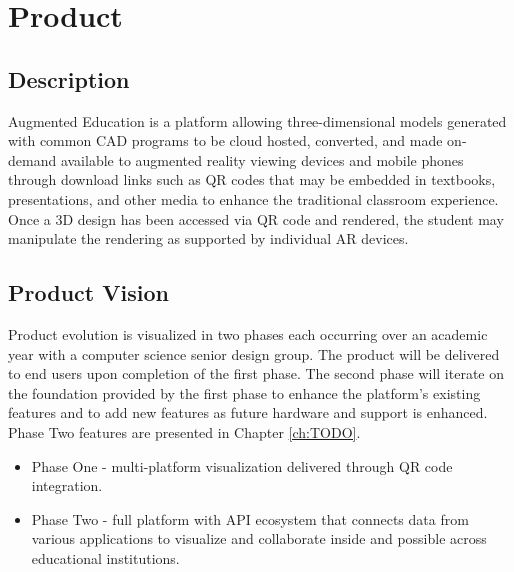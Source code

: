 \section{Product}

\subsection{Description}
Augmented Education is a platform allowing three-dimensional models generated with common CAD programs to be cloud hosted, converted, and made on-demand available to augmented reality viewing devices and mobile phones through download links such as QR codes that may be embedded in textbooks, presentations, and other media to enhance the traditional classroom experience. Once a 3D design has been accessed via QR code and rendered, the student may manipulate the rendering as supported by individual AR devices. 

\subsection{Product Vision}
Product evolution is visualized in two phases each occurring over an academic year with a computer science senior design group. The product will be delivered to end users upon completion of the first phase. The second phase will iterate on the foundation provided by the first phase to enhance the platform's existing features and to add new features as future hardware and support is enhanced. Phase Two features are presented in Chapter \ref{ch:TODO}.

\begin{itemize}
\item Phase One - multi-platform visualization delivered through QR code integration.
\item Phase Two - full platform with API ecosystem that connects data from various applications to visualize and collaborate inside and possible across educational institutions. 
\end{itemize}



